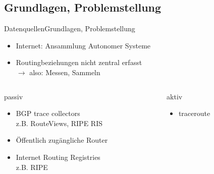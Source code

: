 \documentclass[ngerman,compress,hyperref={bookmarks}]{beamer}
\begin{document}
\subsection{Grundlagen, Problemstellung}
\begin{frame}{Datenquellen}{Grundlagen, Problemstellung}
  \begin{itemize}
    \item Internet: Ansammlung Autonomer Systeme
    \item Routingbeziehungen nicht zentral erfasst\\$\rightarrow$ also: Messen, Sammeln
  \end{itemize}

  \begin{columns}[t]
    \begin{column}{0.4\textwidth}
      passiv
      \begin{itemize}
        \item BGP trace collectors\\{\scriptsize z.B. RouteViews, RIPE RIS}
        \item Öffentlich zugängliche Router
        \item Internet Routing Registries\\{\scriptsize z.B. RIPE}
      \end{itemize}
    \end{column}
    \begin{column}{0.4\textwidth}
      aktiv
      \begin{itemize}
        \item traceroute
      \end{itemize}
    \end{column}
  \end{columns}
\end{frame}
\end{document}
